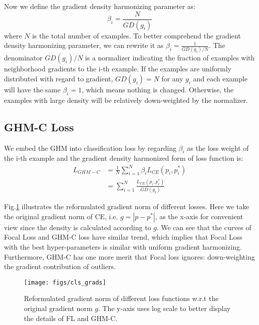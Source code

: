 \documentclass[letterpaper]{article} \usepackage{aaai19}  \usepackage{times}  \usepackage{helvet}  \usepackage{courier}  \usepackage{url}  \usepackage{graphicx}  \usepackage{amsmath,amssymb}
\begin{document}
Now we define the gradient density harmonizing parameter as:
\begin{equation}
\label{eq:beta}
  \beta_i = \frac{N}{GD(g_i)}
\end{equation}
where $N$ is the total number of examples. To better comprehend the gradient density harmonizing parameter, we can rewrite it as $\beta_i = \frac{1}{GD(g_i)/N}$. The denominator $GD(g_i)/N$ is a normalizer indicating the fraction of examples with neighborhood gradients to the i-th example. If the examples are uniformly distributed with regard to gradient, $GD(g_i) = N$ for any $g_i$ and each example will have the same $\beta_i = 1$, which means nothing is changed. Otherwise, the examples with large density will be relatively down-weighted by the normalizer.


\subsection{GHM-C Loss}

We embed the GHM into classification loss by regarding $\beta_i$ as the loss weight of the i-th example and the gradient density harmonized form of loss function is:
\begin{equation}
\label{eq:lghm}
    \begin{aligned}
    L_{GHM-C} &= \frac{1}{N}\sum_{i=1}^N\beta_i L_{CE}(p_i, p_i^*) \\
    &= \sum_{i=1}^N\frac{L_{CE}(p_i, p_i^*)}{GD(g_i)} 
    \end{aligned}
\end{equation}

Fig.\ref{fig:cls_grads} illustrates the reformulated gradient norm of different losses. Here we take the original gradient norm of CE, i.e. $g = |p-p^*|$, as the x-axis for convenient view since the density is calculated according to $g$. We can see that the curves of Focal Loss and GHM-C loss have similar trend, which implies that Focal Loss with the best hyper-parameters is similar with uniform gradient harmonizing. Furthermore, GHM-C has one more merit that Focal loss ignores: down-weighting the gradient contribution of outliers.
\begin{figure}[ht]
\centering
\texttt{[image: figs/cls\_grads]}
\caption{Reformulated gradient norm of different loss functions w.r.t the original gradient norm $g$. The y-axis uses log scale to better display the details of FL and GHM-C.}
\label{fig:cls_grads}
\end{figure}
\end{document}
